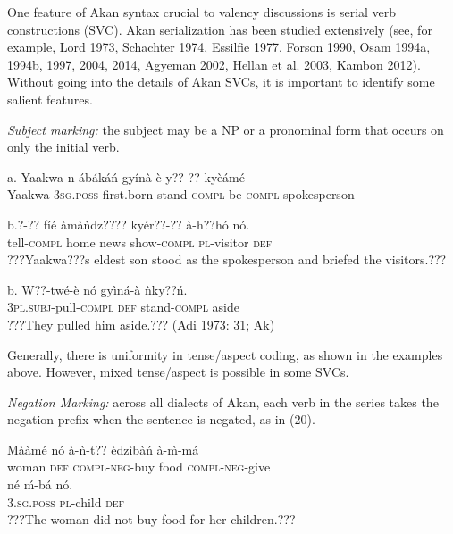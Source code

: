 \documentclass[output=paper]{langsci/langscibook}
\begin{document}
One feature of Akan syntax crucial to valency discussions is serial verb constructions (\textsc{SVC}). Akan serialization has been studied extensively (see, for example, Lord 1973, Schachter 1974, Essilfie 1977, Forson 1990, Osam 1994a, 1994b, 1997, 2004, 2014, Agyeman 2002, Hellan et al. 2003, Kambon 2012). Without going into the details of Akan SVCs, it is important to identify some salient features.

\begin{styleListei}
\emph{Subject marking:} the subject may be a NP or a pronominal form that occurs on only the initial verb. 
\end{styleListei}


\ea
\gll a.  Yaakwa  n-ábákáń     gyínà-è   y??-??     kyèámé\\
       Yaakwa  \textsc{3sg.poss}{}-first.born  stand-\textsc{compl}  be-\textsc{compl}   spokesperson\\
       \z
       
\ea
\gll b.?-??     fíé   àmàǹdz????  kyér??-??   à-h??hó    nó.\\
       tell-\textsc{compl}  home  news    show-\textsc{compl}  \textsc{pl}{}-visitor  \textsc{def}\\
\glt   ???Yaakwa???s eldest son stood as the spokesperson and briefed the visitors.??? \citep[83]{Krampah1970}
\z

\ea
\gll  b.  W??-twé-è    nó  gyìná-à  ǹky??ń.\\
       \textsc{3pl.subj}{}-pull\textsc{{}-compl}  \textsc{def}  stand-\textsc{compl}  aside\\
\glt   ???They pulled him aside.??? (Adi 1973: 31; Ak)
\z

Generally, there is uniformity in tense/aspect coding, as shown in the examples above. However, mixed tense/aspect is possible in some SVCs. 

\begin{styleListei}
\emph{Negation Marking:} across all dialects of Akan, each verb in the series takes the negation prefix when the sentence is negated, as in (20). 
\end{styleListei}

\ea
\gll Mààmé  nó  à-ǹ-t??      èdzìbàń  à-\`{m}-má  \\
     woman  \textsc{def}  \textsc{compl}{}-\textsc{neg}{}-buy  food    \textsc{compl}{}-\textsc{neg}{}-give\\
\gll né    ḿ-bá    nó.\\
     \textsc{3.sg.poss}  \textsc{pl}{}-child  \textsc{def}\\
\glt ???The woman did not buy food for her children.???
\z
\end{document}
